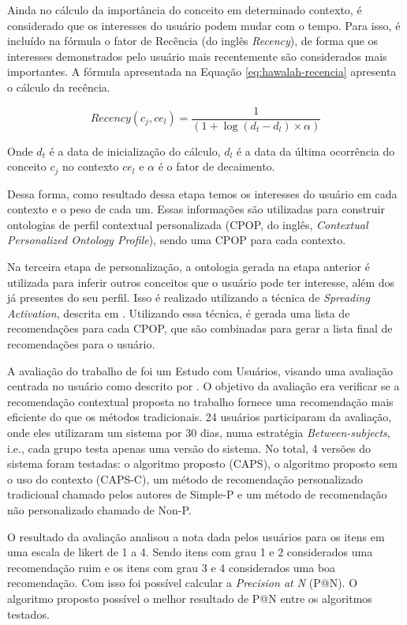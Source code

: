 Ainda no cálculo da importância do conceito em determinado contexto, é considerado que os interesses do usuário podem
mudar com o tempo. Para isso, é incluído na fórmula o fator de Recência (do inglês \textit{Recency}), de forma que os interesses
demonstrados pelo usuário mais recentemente são considerados mais importantes. A fórmula apresentada na Equação
\ref{eq:hawalah-recencia} apresenta o cálculo da recência.

\begin{equation}
  \label{eq:hawalah-recencia}
  Recency(c_j, ce_l) = \frac{1}{(1+\log(d_t - d_l) \times \alpha)}
\end{equation}

Onde $d_t$ é a data de inicialização do cálculo, $d_l$ é a data da última ocorrência do conceito $c_j$ no contexto
$ce_l$ e $\alpha$ é o fator de decaimento.

Dessa forma, como resultado dessa etapa temos os interesses do usuário em cada contexto e o peso de cada um. Essas
informações são utilizadas para construir ontologias de perfil contextual personalizada (CPOP, do inglês, \textit{Contextual
Personalized Ontology Profile}), sendo uma CPOP para cada contexto.

Na terceira etapa de personalização, a ontologia gerada na etapa anterior é utilizada para inferir outros conceitos que
o usuário pode ter interesse, além dos já presentes do seu perfil. Isso é realizado utilizando a técnica de \textit{Spreading
Activation}, descrita em . Utilizando essa técnica, é gerada uma lista de recomendações
para cada CPOP, que são combinadas para gerar a lista final de recomendações para o usuário.

A avaliação do trabalho de  foi um Estudo com Usuários, visando uma avaliação centrada
no usuário como descrito por . O objetivo da avaliação era verificar se a recomendação
contextual proposta no trabalho fornece uma recomendação mais eficiente do que os métodos tradicionais. 24 usuários
participaram da avaliação, onde eles utilizaram um sistema por 30 dias, numa estratégia \textit{Between-subjects}, i.e., cada
grupo testa apenas uma versão do sistema. No total, 4 versões do sistema foram testadas: o algoritmo proposto (CAPS), o
algoritmo proposto sem o uso do contexto (CAPS-C), um método de recomendação personalizado tradicional chamado pelos autores de Simple-P e um
método de recomendação não personalizado chamado de Non-P.

O resultado da avaliação analisou a nota dada pelos usuários para os itens em uma escala de likert de 1 a 4. Sendo itens
com grau 1 e 2 considerados uma recomendação ruim e os itens com grau 3 e 4 considerados uma boa recomendação. Com isso
foi possível calcular a \textit{Precision at N} (P@N). O algoritmo proposto possível o melhor resultado de P@N entre os
algoritmos testados.

